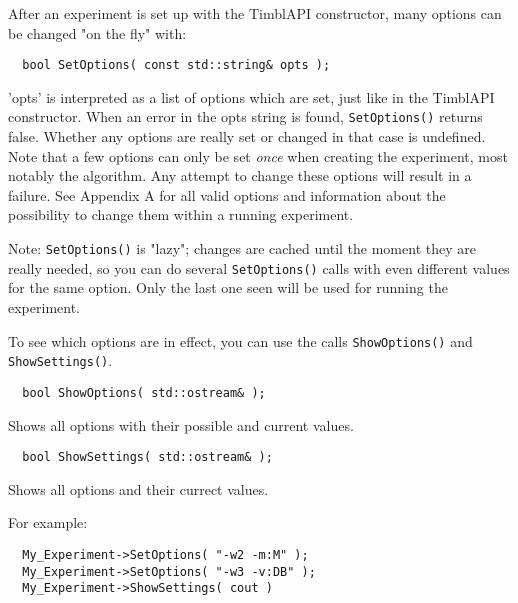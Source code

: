 \documentclass{report}
\begin{document}
After an experiment is set up with the TimblAPI constructor, many
options can be changed "on the fly" with:

\begin{footnotesize}
\begin{verbatim}
  bool SetOptions( const std::string& opts );
\end{verbatim}
\end{footnotesize}

'opts' is interpreted as a list of options which are set, just like in
the TimblAPI constructor. When an error in the opts string is found,
{\tt SetOptions()} returns false. Whether any options are really set
or changed in that case is undefined. Note that a few options can only
be set {\em once}\/ when creating the experiment, most notably the
algorithm. Any attempt to change these options will result in a
failure.  See Appendix A for all valid options and information about
the possibility to change them within a running experiment.

Note: {\tt SetOptions()} is "lazy"; changes are cached until the
moment they are really needed, so you can do several {\tt SetOptions()}
calls with even different values for the same option. Only the last
one seen will be used for running the experiment.

To see which options are in effect, you can use the calls {\tt ShowOptions()}
and {\tt ShowSettings()}.

\begin{footnotesize}
\begin{verbatim}
  bool ShowOptions( std::ostream& );
\end{verbatim}
\end{footnotesize}

Shows all options with their possible and current values.

\begin{footnotesize}
\begin{verbatim}
  bool ShowSettings( std::ostream& );
\end{verbatim}
\end{footnotesize}

Shows all options and their currect values.

For example:

\begin{footnotesize}
\begin{verbatim}
  My_Experiment->SetOptions( "-w2 -m:M" );
  My_Experiment->SetOptions( "-w3 -v:DB" );
  My_Experiment->ShowSettings( cout )
\end{verbatim}
\end{footnotesize}
\end{document}
